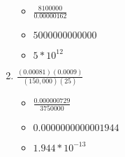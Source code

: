 \begin{enumerate}
\begin{itemize}
  \item {\Large $\frac{8100000}{0.00000162}$}
  \item $5000000000000$
  \item $5 * 10^{12}$
  \end{itemize}
\item {\Large $\frac{(0.00081)(0.0009)}{(150,000)(25)}$}
  \begin{itemize}
  \item {\Large $\frac{0.000000729}{3750000}$}
  \item $0.0000000000001944$
  \item $1.944 * 10^{-13}$
  \end{itemize}
\end{enumerate}
